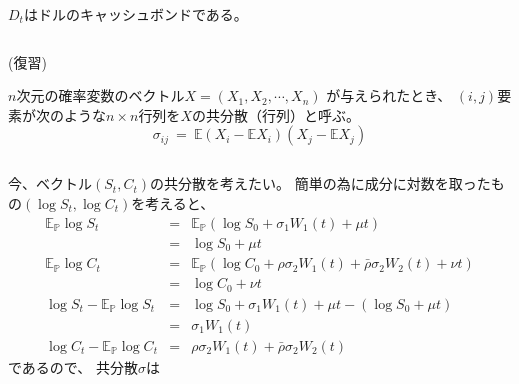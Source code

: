 \documentclass[uplatex,a4j,12pt,dvipdfmx]{jsarticle}
\begin{document}
$D_{t}$はドルのキャッシュボンドである。

${}$

(復習)

$n$次元の確率変数のベクトル$X =(X_{1},X_{2},\cdots,X_{n})$
が与えられたとき、
$(i,j)$要素が次のような$n \times n$行列を$X$の共分散（行列）と呼ぶ。
$$
	\mathbb{\sigma}_{ij}
	\ = \
	\mathbb{E}
	(X_{i} - \mathbb{E} X_{i})
	(X_{j} - \mathbb{E} X_{j})
$$

${}$

今、ベクトル$(S_{t},C_{t})$の共分散を考えたい。
簡単の為に成分に対数を取ったもの$(\log S_{t},\log C_{t})$を考えると、
%
%
\begin{eqnarray*}
	\mathbb{E}_{\mathbb{P}} \log S_{t}
	&=&
	\mathbb{E}_{\mathbb{P}} (\log S_{0} + \sigma_{1} W_{1}(t) + \mu t)
	\\
	&=&
	\log S_{0} + \mu t
	\\
	\mathbb{E}_{\mathbb{P}} \log C_{t}
	&=&
	\mathbb{E}_{\mathbb{P}} (\log C_{0} + \rho \sigma_{2} W_{1}(t) + \bar{\rho} \sigma_{2} W_{2}(t) + \nu t)
	\\
	&=&
	\log C_{0} + \nu t
	\\
	\log S_{t} - \mathbb{E}_{\mathbb{P}} \log S_{t}
	&=&
	\log S_{0} + \sigma_{1} W_{1}(t) + \mu t
	-
	(\log S_{0} + \mu t)
	\\
	&=&
	\sigma_{1} W_{1}(t)
	\\
	\log C_{t} - \mathbb{E}_{\mathbb{P}} \log C_{t}
	&=&
	\rho \sigma_{2} W_{1}(t) + \bar{\rho} \sigma_{2} W_{2}(t)
\end{eqnarray*}
%
%
であるので、
共分散$\mathbb{\sigma}$は
%
%
\end{document}
